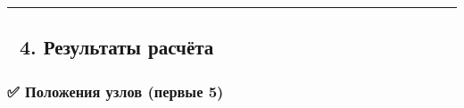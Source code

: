 \documentclass[11pt]{article}
\begin{document}
\begin{center}\rule{0.5\linewidth}{\linethickness}\end{center}

\subsection{🔹 4. Результаты
расчёта}\label{ux440ux435ux437ux443ux43bux44cux442ux430ux442ux44b-ux440ux430ux441ux447ux451ux442ux430}

\subsubsection{✅ Положения узлов (первые
5)}\label{ux43fux43eux43bux43eux436ux435ux43dux438ux44f-ux443ux437ux43bux43eux432-ux43fux435ux440ux432ux44bux435-5}
\end{document}
